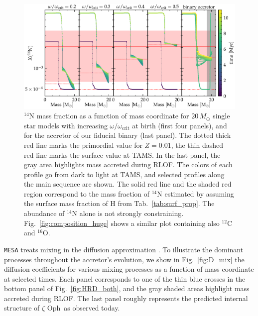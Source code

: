 \documentclass[twocolumn,twocolappendix,trackchanges]{aastex63}
\DeclareRobustCommand{\Figref}[1]{Fig.~\ref{#1}}
\DeclareRobustCommand{\Tabref}[1]{Tab.~\ref{#1}}
\newcommand{\zoph}{$\zeta$ Oph}
\begin{document}
\begin{figure}[htbp]
  \centering
  \includegraphics[width=\textwidth]{n14_struct_complete_zeta_ab}
  \caption{$^{14}\mathrm{N}$ mass fraction as a function of mass
    coordinate for $20\,M_\odot$ single star models with increasing
    $\omega/\omega_\mathrm{crit}$ at birth (first four panels), and
    for the accretor of our fiducial binary (last panel). The dotted thick red line
    marks the primordial value for $Z=0.01$, the thin dashed red line marks the
    surface value at TAMS. In the last panel, the gray area highlights
    mass accreted during RLOF. The colors of each profile go from dark to
    light at TAMS, and selected profiles along the main sequence are
    shown. The solid red line and the shaded red region correspond to the
    mass fraction of $^{14}\mathrm{N}$ estimated by
     assuming the surface mass fraction of H
    from \Tabref{tab:surf_prop}. The abundance of $^{14}\mathrm{N}$
    alone is not strongly constraining. \Figref{fig:composition_huge}
    shows a similar plot containing also $^{12}\mathrm{C}$ and $^{16}\mathrm{O}$.}
  \label{fig:n14}
\end{figure}


\texttt{MESA} treats mixing in the diffusion approximation
\citep{paxton:11}.  To illustrate the dominant processes throughout
the accretor's evolution, we show in \Figref{fig:D_mix} the diffusion
coefficients for various mixing processes as a function of mass
coordinate at selected times. Each panel corresponds to one of the
thin blue crosses in the bottom panel of \Figref{fig:HRD_both}, and
the gray shaded areas highlight mass accreted during RLOF. The last
panel roughly represents the predicted internal structure of \zoph\ as
observed today.
\end{document}
